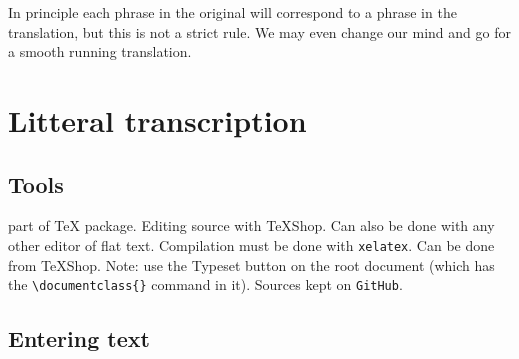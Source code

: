 \documentclass{report}
\begin{document}
In principle each phrase in the original will correspond to a phrase in the translation, but this is not a strict rule.
We may even change our mind and go for a smooth running translation.

\chapter{Litteral transcription}
\section{Tools}
\XeLaTeX{} part of \TeX{} package. Editing source with TeXShop. Can also
be done with any other editor of flat text. 
Compilation must be done with \texttt{xelatex}. Can be done from TeXShop.
Note: use the Typeset button on the root document
(which has the \verb;\documentclass{}; command in it).
Sources kept on \texttt{GitHub}.

\section{Entering text}
\end{document}
